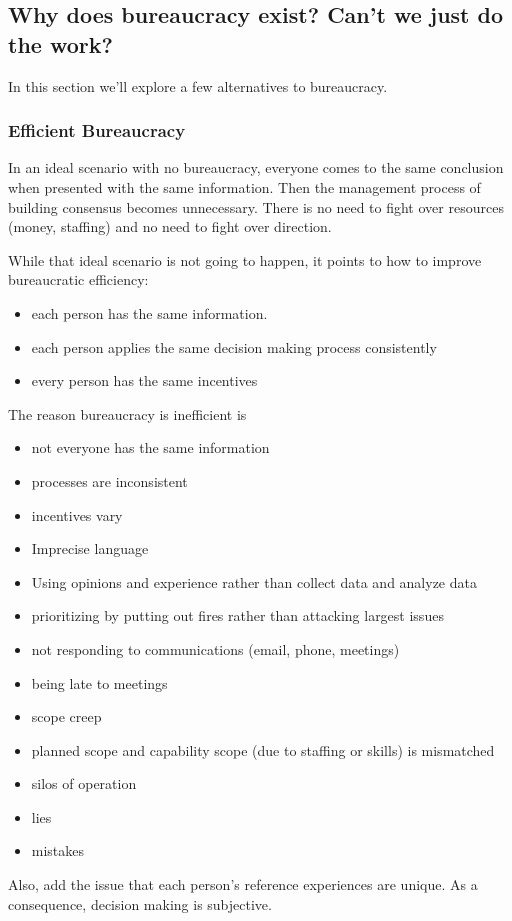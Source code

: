 \subsection{Why does bureaucracy exist? Can't we just do the work?\label{sec:alternatives_to_bureaucracy}}

In this section we'll explore a few alternatives to bureaucracy. 




\subsubsection{Efficient Bureaucracy}

In an ideal scenario with no bureaucracy, everyone comes to the same conclusion when presented with the same information. Then the management process of building consensus becomes unnecessary. There is no need to fight over resources (money, staffing) and no need to fight over direction.

While that ideal scenario is not going to happen, it points to how to improve bureaucratic efficiency:
\begin{itemize}
\item each person has the same information. 
\item each person applies the same decision making process consistently
\item every person has the same incentives
\end{itemize}
The reason bureaucracy is inefficient is
\begin{itemize}
    \item not everyone has the same information
    \item processes are inconsistent
    \item incentives vary
    \item Imprecise language
    \item Using opinions and experience rather than collect data and analyze data
    \item prioritizing by putting out fires rather than attacking largest issues
    \item not responding to communications (email, phone, meetings)
    \item being late to meetings
    \item scope creep
    \item planned scope and capability scope (due to staffing or skills) is mismatched
    \item silos of operation
    \item lies
    \item mistakes
\end{itemize}
Also, add the issue that each person's reference experiences are unique. As a consequence, decision making is subjective. 




